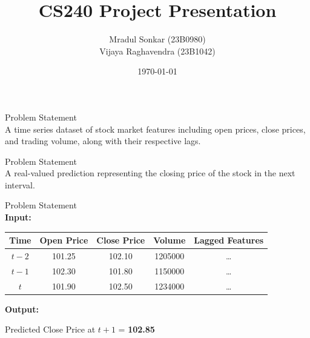 \documentclass[9pt]{beamer}
\title{CS240 Project Presentation}
\author{Mradul Sonkar (23B0980)\\ Vijaya Raghavendra (23B1042)}
\date{\today}
\begin{document}
\maketitle

\begin{frame}{Problem Statement}
    \\[0.2cm]
    A time series dataset of stock market features including
    open prices, close prices, and trading volume, along with their respective
    lags.
\end{frame}

\begin{frame}{Problem Statement}
    \\[0.2cm]
    A real-valued prediction representing the closing price of
    the stock in the next interval.
\end{frame}

\begin{frame}{Problem Statement}
    \\[0.3cm]

    \textbf{Input:}
    \begin{table}[h!]
        \centering
        \begin{tabular}{|c|c|c|c|c|}
            \hline
            \textbf{Time}   & \textbf{Open Price}      & \textbf{Close Price} &
            \textbf{Volume} & \textbf{Lagged Features}
            \\
            \hline
            $t-2$           & 101.25                   & 102.10               &
            1205000         & \dots
            \\
            $t-1$           & 102.30                   & 101.80               &
            1150000         & \dots
            \\
            $t$             & 101.90                   & 102.50               &
            1234000         & \dots
            \\
            \hline
        \end{tabular}
    \end{table}

    \textbf{Output:}\\
    \begin{center}
        Predicted Close Price at $t+1$ = \textbf{102.85}
    \end{center}

\end{frame}
\end{document}
